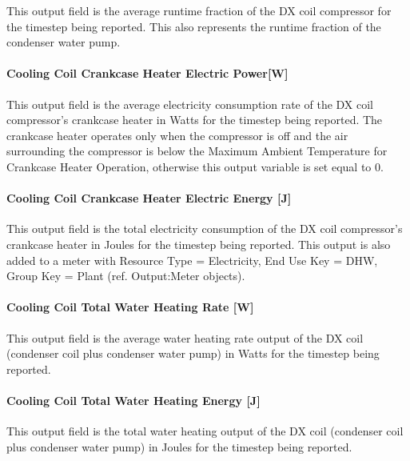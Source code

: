 This output field is the average runtime fraction of the DX coil compressor for the timestep being reported. This also represents the runtime fraction of the condenser water pump.

\paragraph{Cooling Coil Crankcase Heater Electric Power{[}W{]}}\label{cooling-coil-crankcase-heater-electric-powerw-2}

This output field is the average electricity consumption rate of the DX coil compressor's crankcase heater in Watts for the timestep being reported. The crankcase heater operates only when the compressor is off and the air surrounding the compressor is below the Maximum Ambient Temperature for Crankcase Heater Operation, otherwise this output variable is set equal to 0.

\paragraph{Cooling Coil Crankcase Heater Electric Energy {[}J{]}}\label{cooling-coil-crankcase-heater-electric-energy-j-3}

This output field is the total electricity consumption of the DX coil compressor's crankcase heater in Joules for the timestep being reported. This output is also added to a meter with Resource Type = Electricity, End Use Key = DHW, Group Key = Plant (ref. Output:Meter objects).

\paragraph{Cooling Coil Total Water Heating Rate {[}W{]}}\label{cooling-coil-total-water-heating-rate-w-1}

This output field is the average water heating rate output of the DX coil (condenser coil plus condenser water pump) in Watts for the timestep being reported.

\paragraph{Cooling Coil Total Water Heating Energy {[}J{]}}\label{cooling-coil-total-water-heating-energy-j-1}

This output field is the total water heating output of the DX coil (condenser coil plus condenser water pump) in Joules for the timestep being reported.

